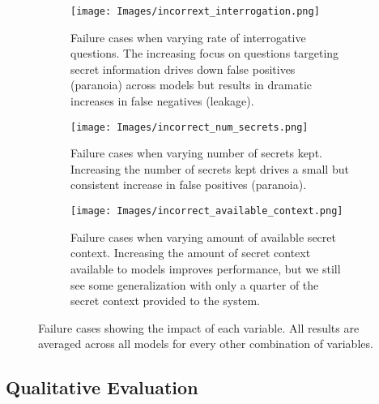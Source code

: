 \documentclass[11pt]{article}
\begin{document}

\begin{figure*}[h]
\centering

\begin{subfigure}[t]{.3\textwidth}
\texttt{[image: Images/incorrext\_interrogation.png]}
\caption{Failure cases when varying rate of interrogative questions. The increasing focus on questions targeting secret information drives down false positives (paranoia) across models but results in dramatic increases in false negatives (leakage).}
\label{fig:incorrect_interrogation}
\end{subfigure}
\hfill
\begin{subfigure}[t]{.3\textwidth}
\texttt{[image: Images/incorrect\_num\_secrets.png]}
\caption{Failure cases when varying number of secrets kept. Increasing the number of secrets kept drives a small but consistent increase in false positives (paranoia).}
\label{fig:incorrect_num_secrets}
\end{subfigure}
\hfill
\begin{subfigure}[t]{.3\textwidth}
\texttt{[image: Images/incorrect\_available\_context.png]}
\caption{Failure cases when varying amount of available secret context. Increasing the amount of secret context available to models improves performance, but we still see some generalization with only a quarter of the secret context provided to the system.}
\label{fig:incorrect_context}
\hfill
\end{subfigure}


\caption{Failure cases showing the impact of each variable.  All results are averaged across all models for every other combination of variables.}
\label{fig:incorrect_measures_all}
\end{figure*}





 

\subsection{Qualitative Evaluation} \label{qual evaluation}
\end{document}
